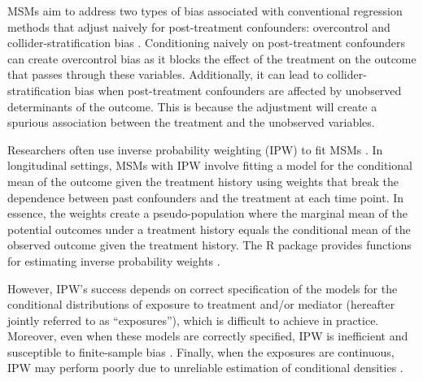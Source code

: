 MSMs aim to address two types of bias associated with conventional
regression methods that adjust naively for post-treatment confounders:
overcontrol and collider-stratification bias
\citetext{\citealp{robinsNewApproachCausal1986}; \citeyear{robinsMarginalStructuralModels2000a}}.
Conditioning naively on post-treatment confounders can create
overcontrol bias as it blocks the effect of the treatment on the outcome
that passes through these variables. Additionally, it can lead to
collider-stratification bias when post-treatment confounders are
affected by unobserved determinants of the outcome. This is because the
adjustment will create a spurious association between the treatment and
the unobserved variables.

Researchers often use inverse probability weighting (IPW) to fit MSMs
\citep[for an in-depth exposition of the method,
see][]{robinsMarginalStructuralModels2000, robinsMarginalStructuralModels2000a, coleConstructingInverseProbability2008a}.
In longitudinal settings, MSMs with IPW involve fitting a model for the
conditional mean of the outcome given the treatment history using
weights that break the dependence between past confounders and the
treatment at each time point. In essence, the weights create a
pseudo-population where the marginal mean of the potential outcomes
under a treatment history equals the conditional mean of the observed
outcome given the treatment history. The R package 
provides functions for estimating inverse probability weights
\citep{vanderwalIpwPackageInverse2011, R-ipw}.

However, IPW's success depends on correct specification of the models
for the conditional distributions of exposure to treatment and/or
mediator (hereafter jointly referred to as ``exposures''), which is
difficult to achieve in practice. Moreover, even when these models are
correctly specified, IPW is inefficient and susceptible to finite-sample
bias
\citep{zhouResidualBalancingMethod2020a, wangDiagnosingBiasInverse2006}.
Finally, when the exposures are continuous, IPW may perform poorly due
to unreliable estimation of conditional densities
\citep{naimiConstructingInverseProbability2014, vansteelandtEstimatingDirectEffects2009}.

